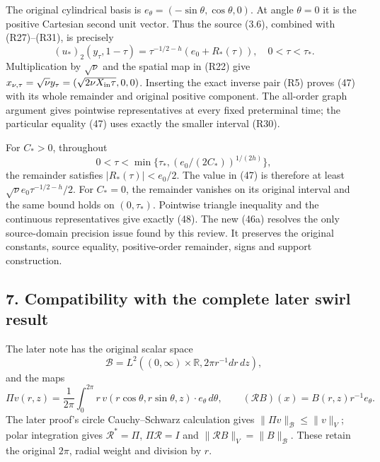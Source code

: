 The original cylindrical basis is \(e_\theta=(-\sin\theta,\cos\theta,0)\). At angle \(\theta=0\) it is the positive Cartesian second unit vector. Thus the source (3.6), combined with (R27)--(R31), is precisely \[
(u_*)_2(y_\tau,1-\tau)
=\tau^{-1/2-h}(e_0+R_*(\tau)),
\quad0<\tau<\tau_*.
\tag{R32}
\] Multiplication by \(\sqrt\nu\) and the spatial map in (R22) give \(x_{\nu,\tau}=\sqrt\nu y_\tau=(\sqrt{2\nu X_{\rm in}\tau},0,0)\). Inserting the exact inverse pair (R5) proves (47) with its whole remainder and original positive component. The all-order graph argument gives pointwise representatives at every fixed preterminal time; the particular equality (47) uses exactly the smaller interval (R30).

For \(C_*>0\), throughout \[
0<\tau<\min\{\tau_*,(e_0/(2C_*))^{1/(2h)}\},
\] the remainder satisfies \(|R_*(\tau)|<e_0/2\). The value in (47) is therefore at least \(\sqrt\nu e_0\tau^{-1/2-h}/2\). For \(C_*=0\), the remainder vanishes on its original interval and the same bound holds on \((0,\tau_*)\). Pointwise triangle inequality and the continuous representatives give exactly (48). The new (46a) resolves the only source-domain precision issue found by this review. It preserves the original constants, source equality, positive-order remainder, signs and support construction.

\subsection*{7. Compatibility with the complete later swirl result}

The later note has the original scalar space \[
\mathcal B=L^2((0,\infty)\times\mathbb R,2\pi r^{-1}dr\,dz),
\] and the maps \[
\Pi v(r,z)=\frac1{2\pi}\int_0^{2\pi}
r\,v(r\cos\theta,r\sin\theta,z)\cdot e_\theta\,d\theta,
\qquad (\mathcal R B)(x)=B(r,z)r^{-1}e_\theta.
\tag{R33}
\] The later proof's circle Cauchy--Schwarz calculation gives \(\|\Pi v\|_{\mathcal B}\le\|v\|_V\); polar integration gives \(\mathcal R^*=\Pi\), \(\Pi\mathcal R=I\) and \(\|\mathcal R B\|_V=\|B\|_{\mathcal B}\). These retain the original \(2\pi\), radial weight and division by \(r\).

